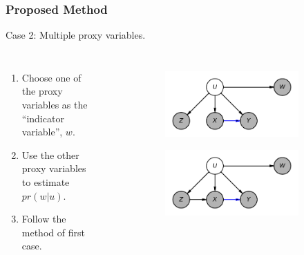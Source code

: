 \documentclass{beamer}
\begin{document}
\begin{frame}
\frametitle{Proposed Method}

Case 2: Multiple proxy variables.
\begin{columns}
	\begin{enumerate}
		\item Choose one of the proxy variables as the ``indicator variable'', $ w $.
		\item Use the other proxy variables to estimate $ pr(w | u) $.
		\item Follow the method of first case.
	\end{enumerate}


    \begin{figure}
	\begin{subfigure}{0.5\textwidth}
    		\centering
    		\includegraphics[scale=0.5]{scripts/double_proxy.png}
	\end{subfigure}
	\begin{subfigure}{0.5\textwidth}
    		\centering
    		\includegraphics[scale=0.5]{scripts/double_proxy_with_extra_edge.png}
	\end{subfigure}
    \end{figure}

\end{columns}

\end{frame}
\end{document}
